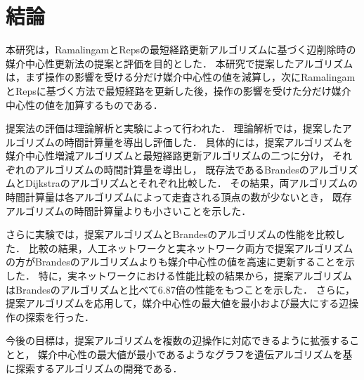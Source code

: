 \chapter{結論}
\label{chap:conclusion}
本研究は，RamalingamとRepsの最短経路更新アルゴリズムに基づく辺削除時の媒介中心性更新法の提案と評価を目的とした．
本研究で提案したアルゴリズムは，まず操作の影響を受ける分だけ媒介中心性の値を減算し，次にRamalingamとRepsに基づく方法で最短経路を更新した後，操作の影響を受けた分だけ媒介中心性の値を加算するものである．

提案法の評価は理論解析と実験によって行われた．
理論解析では，提案したアルゴリズムの時間計算量を導出し評価した．
具体的には，提案アルゴリズムを媒介中心性増減アルゴリズムと最短経路更新アルゴリズムの二つに分け，
それぞれのアルゴリズムの時間計算量を導出し，
既存法であるBrandesのアルゴリズムとDijkstraのアルゴリズムとそれぞれ比較した．
その結果，両アルゴリズムの時間計算量は各アルゴリズムによって走査される頂点の数が少ないとき，
既存アルゴリズムの時間計算量よりも小さいことを示した．

さらに実験では，提案アルゴリズムとBrandesのアルゴリズムの性能を比較した．
比較の結果，人工ネットワークと実ネットワーク両方で提案アルゴリズムの方がBrandesのアルゴリズムよりも媒介中心性の値を高速に更新することを示した．
特に，実ネットワークにおける性能比較の結果から，提案アルゴリズムはBrandesのアルゴリズムと比べて$6.87$倍の性能をもつことを示した．
さらに，提案アルゴリズムを応用して，媒介中心性の最大値を最小および最大にする辺操作の探索を行った．

今後の目標は，提案アルゴリズムを複数の辺操作に対応できるように拡張することと，
媒介中心性の最大値が最小であるようなグラフを遺伝アルゴリズムを基に探索するアルゴリズムの開発である．

